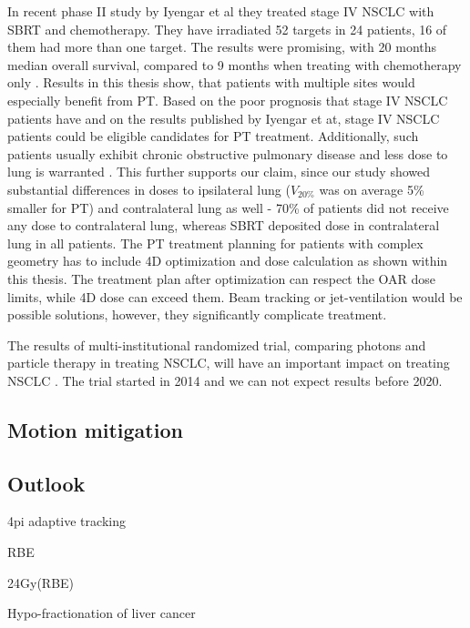 \documentclass[type=dr, dr=rernat, accentcolor=tud7b,colorbacktitle, bigchapter, openright, twoside, 12pt ]{tudthesis}
\begin{document}
In recent phase II study by Iyengar et al \cite{Iyengar2014} they treated stage IV NSCLC with SBRT and chemotherapy. They have irradiated 52 targets in 24 patients, 16 of them had more than one target. The results were promising, with 20 months median overall survival, 
compared to 9 months when treating with chemotherapy only \cite{Tsao2008}. Results in this thesis show, that patients with multiple sites would especially benefit from PT. Based on the poor prognosis that stage IV NSCLC patients have and on the results published by Iyengar et at,
stage IV NSCLC patients could be eligible candidates for PT treatment. Additionally, such patients usually exhibit chronic obstructive pulmonary disease and less dose to lung is warranted \cite{Westover2012}. This further supports our claim, since our study showed substantial differences in 
doses to ipsilateral lung ($V_{20\%}$ was on average 5\% smaller for PT) and contralateral lung as well - 70\% of patients did not receive any dose to contralateral lung, whereas SBRT deposited dose in contralateral lung in all patients.
The PT treatment planning for patients with complex geometry has to include 4D optimization and dose calculation as shown within this thesis. The treatment plan after optimization can respect the
OAR dose limits, while 4D dose can exceed them. Beam tracking or jet-ventilation would be possible solutions, however, they significantly complicate treatment.

The results of multi-institutional randomized trial, comparing photons and particle therapy in treating NSCLC, will have an important impact on treating NSCLC \cite{RTOG1308}. The trial started in 2014 and we can not expect results before 2020.

\subsection{Motion mitigation}


\subsection{Outlook}


4pi
adaptive
tracking



RBE

24Gy(RBE) %

Hypo-fractionation of liver cancer %
\end{document}
